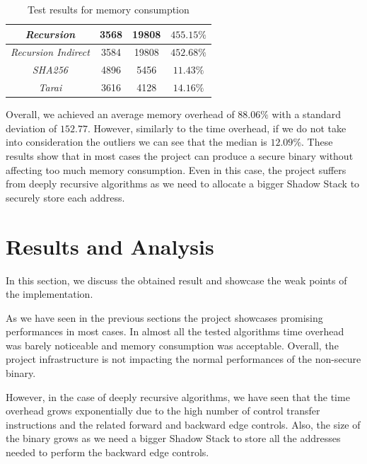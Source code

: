 \begin{table}
\begin{tabular}{|c|c|c|c|}
    \hline
    \textit{Recursion}                   & 3568                         & 19808                        & $455.15\%$               \\
    \hline
    \textit{Recursion Indirect}          & 3584                         & 19808                        & $452.68\%$               \\
    \hline
    \textit{SHA256}                      & 4896                         & 5456                         & $11.43\%$                \\
    \hline
    \textit{Tarai}                       & 3616                         & 4128                         & $14.16\%$                \\
    \hline
  \end{tabular}
  \caption{Test results for memory consumption}
  \label{tab:binsize}
\end{table}

Overall, we achieved an average memory overhead of $88.06\%$ with a standard
deviation of $152.77$. However, similarly to the time overhead, if we do not take
into consideration the outliers we can see that the median is $1 2.09 \%$. These
results show that in most cases the project can produce a secure binary without
affecting too much memory consumption. Even in this case, the project suffers
from deeply recursive algorithms as we need to allocate a bigger Shadow Stack to
securely store each address.

\section{Results and Analysis}
\label{sec:pa_results}

In this section, we discuss the obtained result and showcase the weak points of
the implementation.

As we have seen in the previous sections the project showcases promising
performances in most cases. In almost all the tested algorithms time overhead was
barely noticeable and memory consumption was acceptable. Overall, the project infrastructure
is not impacting the normal performances of the non-secure binary.

However, in the case of deeply recursive algorithms, we have seen that the time overhead
grows exponentially due to the high number of control transfer instructions and the
related forward and backward edge controls. Also, the size of the binary grows as
we need a bigger Shadow Stack to store all the addresses needed to perform the backward
edge controls.

